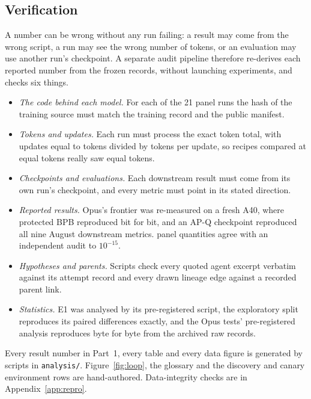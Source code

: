 \documentclass{article}
\newif\ifshowhumanmarkers \showhumanmarkersfalse
\newcommand{\humantag}[1]{{\color{humanframe}\sffamily\scriptsize\bfseries HUMAN AUTHOR MUST REWRITE/VERIFY [#1]}\ }
\newcommand{\humanauthor}[2][]{\ifshowhumanmarkers\begin{humanbox}\humantag{#1}#2\end{humanbox}\else #2\par\fi}
\begin{document}
\subsection{Verification}\label{sec:verification}
\humanauthor[P2-07 r6]{A number can be wrong without any run failing: a result may come from the wrong script, a run may see the wrong number of tokens, or an evaluation may use another run's checkpoint. A separate audit pipeline therefore re-derives each reported number from the frozen records, without launching experiments, and checks six things.
{\setlength{\leftmargini}{1.2em}\begin{itemize}\setlength{\itemsep}{0pt}\setlength{\parskip}{0pt}\setlength{\topsep}{1pt}
\item \emph{The code behind each model.} For each of the 21 panel runs the hash of the training source must match the training record and the public manifest.
\item \emph{Tokens and updates.} Each run must process the exact token total, with updates equal to tokens divided by tokens per update, so recipes compared at equal tokens really saw equal tokens.
\item \emph{Checkpoints and evaluations.} Each downstream result must come from its own run's checkpoint, and every metric must point in its stated direction.
\item \emph{Reported results.} Opus's frontier was re-measured on a fresh A40, where protected BPB reproduced bit for bit, and an AP-Q checkpoint reproduced all nine August downstream metrics. \CRNCrossChecked{} panel quantities agree with an independent audit to $10^{-15}$.
\item \emph{Hypotheses and parents.} Scripts check every quoted agent excerpt verbatim against its attempt record and every drawn lineage edge against a recorded parent link.
\item \emph{Statistics.} E1 was analysed by its pre-registered script, the exploratory split reproduces its paired differences exactly, and the Opus tests' pre-registered analysis reproduces byte for byte from the archived raw records.
\end{itemize}}
Every result number in Part~1, every table and every data figure is generated by scripts in \texttt{analysis/}. Figure~\ref{fig:loop}, the glossary and the discovery and canary environment rows are hand-authored. Data-integrity checks are in Appendix~\ref{app:repro}.}
\end{document}
